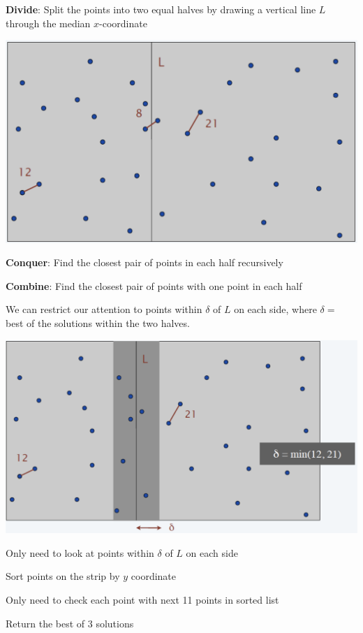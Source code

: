 \begin{listu}
    \item \textbf{Divide}: Split the points into two equal halves by drawing a vertical line $L$ through the median $x$-coordinate

    \begin{center} \includegraphics[width=0.55\linewidth]{figures/Closest Pair Divide.png} \end{center}

    \item \textbf{Conquer}: Find the closest pair of points in each half recursively

    \item \textbf{Combine}: Find the closest pair of points with one point in each half

    We can restrict our attention to points within $\delta$ of $L$ on each side, where $\delta = $ best of the solutions within the two halves. 

    \begin{center} \includegraphics[width=0.55\linewidth]{figures/Closest Pair Conquer.png} \end{center}

    \begin{listu}
        \item Only need to look at points within $\delta$ of $L$ on each side
        \item Sort points on the strip by $y$ coordinate
        \item Only need to check each point with next 11 points in sorted list
    \end{listu}

    \item Return the best of 3 solutions
\end{listu}

